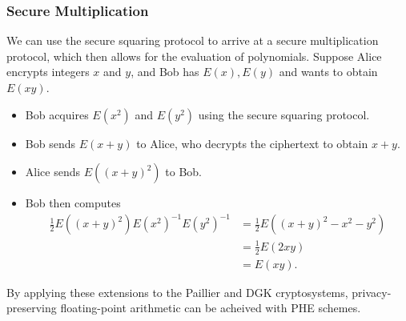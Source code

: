 \subsubsection{Secure Multiplication}
We can use the secure squaring protocol to arrive at a secure multiplication protocol, which then allows for the evaluation of polynomials.
Suppose Alice encrypts integers $x$ and $y$, and Bob has $E\left(x\right), E\left(y\right)$ and wants to obtain $E\left(xy\right)$.
\begin{itemize}
	\item Bob acquires $E\left(x^2\right)$ and $E\left(y^2\right)$ using the secure squaring protocol.
	\item Bob sends $E\left(x+y\right)$ to Alice, who decrypts the ciphertext to obtain $x+y$.
	\item Alice sends $E\left(\left(x+y\right)^2\right)$ to Bob.
	\item Bob then computes
	\begin{align*}
		\frac{1}{2}E\left(\left(x+y\right)^2\right)E\left(x^2\right)^{-1}E\left(y^2\right)^{-1} &= \frac{1}{2}E\left(\left(x+y\right)^2 - x^2 - y^2\right)\\
		&= \frac{1}{2}E\left(2xy\right)\\
		&= E\left(xy\right).
	\end{align*}
\end{itemize}

By applying these extensions to the Paillier and DGK cryptosystems, privacy-preserving floating-point arithmetic can be acheived with PHE schemes. 
